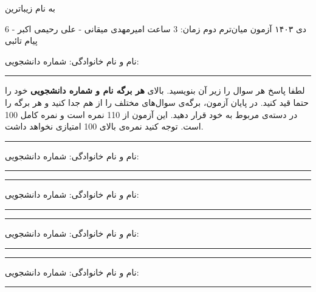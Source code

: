 
\usepackage{assets/template}
\newcommand{\hidesolutions}{}


{\centering به نام زیباترین}\\
	\def\ci{\perp\!\!\!\perp}

	\header
		{6 دی ۱۴۰۳}
		{آزمون میان‌ترم دوم}
		{زمان:  3  ساعت}
		{امیرمهدی میقانی - علی رحیمی اکبر - پیام تائبی}{}
	
\vspace{-3mm}
نام و نام خانوادگی: \hspace{8cm} شماره دانشجویی:

\hrule
\vspace{2mm}
لطفا پاسخ هر سوال را زیر آن بنویسید. بالای \textbf{هر برگه نام و شماره دانشجویی} خود را حتما قید کنید. در پایان آزمون، برگه‌ی سوال‌های مختلف را از هم جدا کنید و هر برگه را در دسته‌ی مربوط به خود قرار دهید.
این آزمون از 110 نمره است و نمره کامل 100 است. توجه کنید نمره‌ی بالای 100 امتیازی نخواهد داشت.



\vspace{0.5cm}

\pagebreak

\pagebreak
\hrule
% 
% 
نام و نام خانوادگی: \hspace{8cm} شماره دانشجویی:
\hrule
\vspace{0.5cm}

\pagebreak

\pagebreak
\hrule
نام و نام خانوادگی: \hspace{8cm} شماره دانشجویی:
\hrule
\vspace{0.5cm}

\pagebreak

\pagebreak
\hrule
نام و نام خانوادگی: \hspace{8cm} شماره دانشجویی:
\hrule
\vspace{0.5cm}


\pagebreak

\pagebreak
\hrule
نام و نام خانوادگی: \hspace{8cm} شماره دانشجویی:
\hrule
\vspace{0.5cm}

\pagebreak



